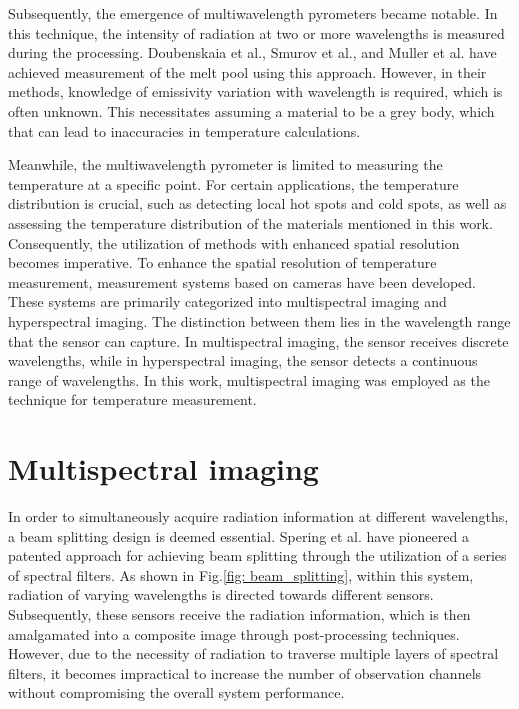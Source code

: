 Subsequently, the emergence of multiwavelength pyrometers became notable. 
In this technique, the intensity of radiation at two or more wavelengths 
is measured during the processing. 
Doubenskaia et al.\cite{Doubenskaia.2013}, Smurov et al.\cite{Smurov.2013b}, and Muller et al.\cite{Muller.2012} 
have achieved measurement of the melt pool using this approach. 
However, in their methods, knowledge of emissivity variation with 
wavelength is required, which is often unknown. This necessitates 
assuming a material to be a grey body, which that can lead to 
inaccuracies in temperature calculations.

Meanwhile, the multiwavelength pyrometer is limited to measuring the 
temperature at a specific point. For certain applications, 
the temperature distribution is crucial, such as detecting local hot 
spots and cold spots, as well as assessing the temperature 
distribution of the materials mentioned in this work. Consequently, the 
utilization of methods with enhanced spatial resolution becomes imperative\cite{Grujic.2023}.
To enhance the spatial resolution of temperature measurement, 
measurement systems based on cameras have been developed. 
These systems are primarily categorized into multispectral 
imaging and hyperspectral imaging. The distinction between them 
lies in the wavelength range that the sensor can capture. 
In multispectral imaging, the sensor receives discrete wavelengths, 
while in hyperspectral imaging, the sensor detects a continuous 
range of wavelengths\cite{Devesse.2017}. In this work, multispectral 
imaging was employed as the technique for temperature measurement.
%
%
\section{Multispectral imaging}%
In order to simultaneously acquire radiation information at different 
wavelengths, a beam splitting design is deemed essential. Spering et al. 
have pioneered a patented approach for achieving beam splitting 
through the utilization of a series of spectral filters\cite{Spiering.1999}. 
As shown in Fig.\ref{fig: beam_splitting}, within this system, radiation of varying wavelengths is directed towards 
different sensors. Subsequently, these sensors receive the radiation 
information, which is then amalgamated into a composite image through 
post-processing techniques. However, due to the necessity of radiation 
to traverse multiple layers of spectral filters, it becomes impractical 
to increase the number of observation channels without compromising the 
overall system performance.

